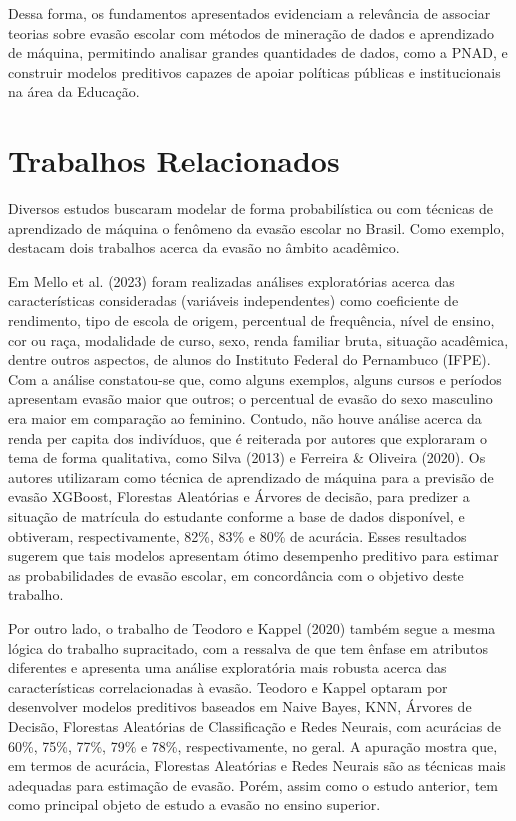 \documentclass[english, spanish, brazilian]{RBIEarticle} %
\begin{document}
Dessa forma, os fundamentos apresentados evidenciam a relevância de associar teorias sobre evasão escolar com métodos de mineração de dados e aprendizado de máquina, permitindo analisar grandes quantidades de dados, como a PNAD, e construir modelos preditivos capazes de apoiar políticas públicas e institucionais na área da Educação.

\section{Trabalhos Relacionados}
Diversos estudos buscaram modelar de forma probabilística ou com técnicas de aprendizado de máquina o fenômeno da evasão escolar no Brasil. Como exemplo, destacam dois trabalhos acerca da evasão no âmbito acadêmico.

Em Mello et al. (2023) foram realizadas análises exploratórias acerca das características consideradas (variáveis independentes) como coeficiente de rendimento, tipo de escola de origem, percentual de frequência, nível de ensino, cor ou raça, modalidade de curso, sexo, renda familiar bruta, situação acadêmica, dentre outros aspectos, de alunos do Instituto Federal do Pernambuco (IFPE). Com a análise constatou-se que, como alguns exemplos, alguns cursos e períodos apresentam evasão maior que outros; o percentual de evasão do sexo masculino era maior em comparação ao feminino. Contudo, não houve análise acerca da renda per capita dos indivíduos, que é reiterada por autores que exploraram o tema de forma qualitativa, como Silva (2013) e Ferreira \& Oliveira (2020). Os autores utilizaram como técnica de aprendizado de máquina para a previsão de evasão XGBoost, Florestas Aleatórias e Árvores de decisão, para predizer a situação de matrícula do estudante conforme a base de dados disponível, e obtiveram, respectivamente, 82\%, 83\% e 80\% de acurácia. Esses resultados sugerem que tais modelos apresentam ótimo desempenho preditivo para estimar as probabilidades de evasão escolar, em concordância com o objetivo deste trabalho.

Por outro lado, o trabalho de Teodoro e Kappel (2020) também segue a mesma lógica do trabalho supracitado, com a ressalva de que tem ênfase em atributos diferentes e apresenta uma análise exploratória mais robusta acerca das características correlacionadas à evasão. Teodoro e Kappel optaram por desenvolver modelos preditivos baseados em Naive Bayes, KNN, Árvores de Decisão, Florestas Aleatórias de Classificação e Redes Neurais, com acurácias de 60\%, 75\%, 77\%, 79\% e 78\%, respectivamente, no geral. A apuração mostra que, em termos de acurácia, Florestas Aleatórias e Redes Neurais são as técnicas mais adequadas para estimação de evasão. Porém, assim como o estudo anterior, tem como principal objeto de estudo a evasão no ensino superior.  
\end{document}
